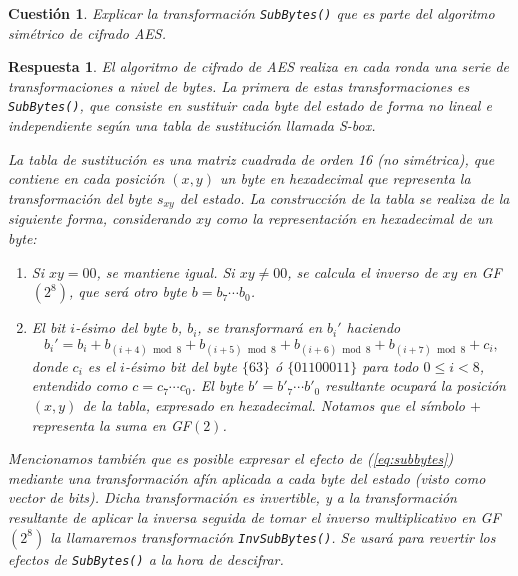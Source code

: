 \documentclass[
  a4paper,
  spanish,
  12pt,
]{scrartcl}
\theoremstyle{ejercicio-style}
\newtheorem{ejer}{Cuestión}
\theoremstyle{remark-style}
\newtheorem*{sol}{Respuesta}
\theoremstyle{teorema-style}
\begin{document}
\begin{ejer}
  Explicar la transformación \texttt{SubBytes()} que es parte del algoritmo simétrico de cifrado AES.
\end{ejer}

\begin{sol}
El algoritmo de cifrado de AES realiza en cada ronda una serie de transformaciones a nivel de \textit{bytes}. La primera de estas transformaciones es \texttt{SubBytes()}, que consiste en sustituir cada \textit{byte} del estado de forma no lineal e independiente según una tabla de sustitución llamada S-box.

La tabla de sustitución es una matriz cuadrada de orden 16 (no simétrica), que contiene en cada posición $(x,y)$ un \textit{byte} en hexadecimal que representa la transformación del \textit{byte} $s_{xy}$ del estado. La construcción de la tabla se realiza de la siguiente forma, considerando $xy$ como la representación en hexadecimal de un \textit{byte}:

\begin{enumerate}
\item Si $xy = 00$, se mantiene igual. Si $xy \neq 00$, se calcula el inverso de $xy$ en GF$(2^8)$, que será otro \textit{byte} $b = b_7\cdots b_0$.
\item El bit $i$-ésimo del \textit{byte} $b$, $b_i$, se transformará en $b_i'$ haciendo
\begin{equation}
  \label{eq:subbytes}
  b_i' = b_i + b_{(i+4)\bmod 8} + b_{(i+5)\bmod 8} + b_{(i+6)\bmod 8} + b_{(i+7)\bmod 8} + c_i,
\end{equation}
donde $c_i$ es el $i$-ésimo bit del \textit{byte} $\{63\}$ ó $\{01100011\}$ para todo $0 \leq i < 8$, entendido como $c=c_7\cdots c_0$. El \textit{byte} $b' = b'_7\cdots b'_0$ resultante ocupará la posición $(x,y)$ de la tabla, expresado en hexadecimal. Notamos que el símbolo $+$ representa la suma en GF$(2)$.

\end{enumerate}

Mencionamos también que es posible expresar el efecto de (\ref{eq:subbytes}) mediante una transformación afín aplicada a cada \textit{byte} del estado (visto como vector de bits). Dicha transformación es invertible, y a la transformación resultante de aplicar la inversa seguida de tomar el inverso multiplicativo en GF$(2^8)$ la llamaremos transformación \texttt{InvSubBytes()}. Se usará para revertir los efectos de \texttt{SubBytes()} a la hora de descifrar.


\end{sol}
\end{document}
